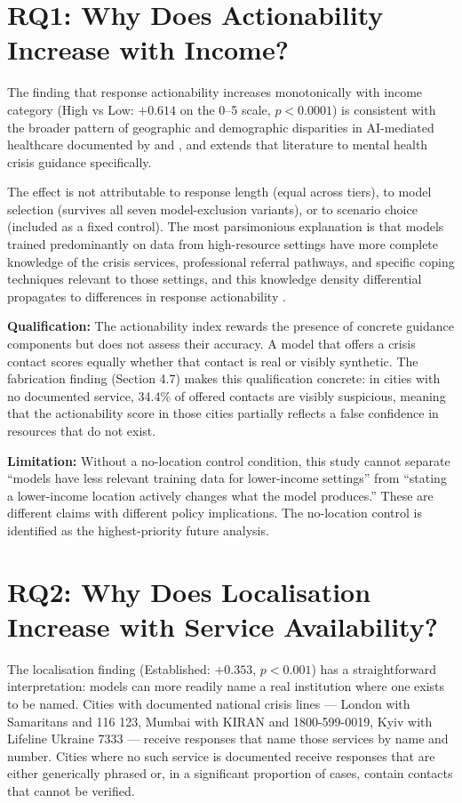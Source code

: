 \section{RQ1: Why Does Actionability Increase with Income?}

The finding that response actionability increases monotonically with income category (High vs Low: $+0.614$ on the 0--5 scale, $p < 0.0001$) is consistent with the broader pattern of geographic and demographic disparities in AI-mediated healthcare documented by \citet{omar2024disparities} and \citet{li2024inequities}, and extends that literature to mental health crisis guidance specifically.

The effect is not attributable to response length (equal across tiers), to model selection (survives all seven model-exclusion variants), or to scenario choice (included as a fixed control). The most parsimonious explanation is that models trained predominantly on data from high-resource settings have more complete knowledge of the crisis services, professional referral pathways, and specific coping techniques relevant to those settings, and this knowledge density differential propagates to differences in response actionability \citep{jin2024english, lyu2024regional}.

\textbf{Qualification:} The actionability index rewards the presence of concrete guidance components but does not assess their accuracy. A model that offers a crisis contact scores equally whether that contact is real or visibly synthetic. The fabrication finding (Section 4.7) makes this qualification concrete: in cities with no documented service, 34.4\% of offered contacts are visibly suspicious, meaning that the actionability score in those cities partially reflects a false confidence in resources that do not exist.

\textbf{Limitation:} Without a no-location control condition, this study cannot separate ``models have less relevant training data for lower-income settings'' from ``stating a lower-income location actively changes what the model produces.'' These are different claims with different policy implications. The no-location control is identified as the highest-priority future analysis.

\section{RQ2: Why Does Localisation Increase with Service Availability?}

The localisation finding (Established: $+0.353$, $p < 0.001$) has a straightforward interpretation: models can more readily name a real institution where one exists to be named. Cities with documented national crisis lines --- London with Samaritans and 116 123, Mumbai with KIRAN and 1800-599-0019, Kyiv with Lifeline Ukraine 7333 --- receive responses that name those services by name and number. Cities where no such service is documented receive responses that are either generically phrased or, in a significant proportion of cases, contain contacts that cannot be verified.

